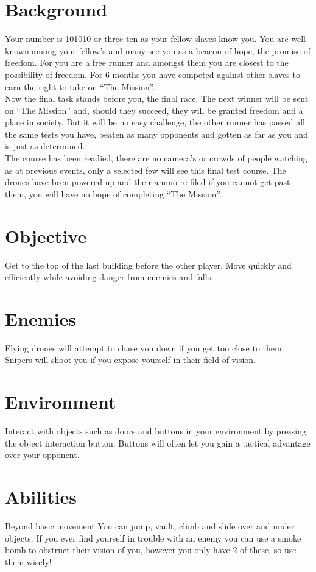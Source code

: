 \documentclass[11pt,a4paper]{article}
\begin{document}
\section*{Background}
Your number is 101010 or three-ten as your fellow slaves know you. You are well known among your fellow’s and many see you as a beacon of hope, the promise of freedom. For you are a free runner and amongst them you are closest to the possibility of freedom. For 6 months you have competed against other slaves to earn the right to take on ``The Mission''.\smallskip\\
Now the final task stands before you, the final race. The next winner will be sent on ``The Mission'' and, should they succeed, they will be granted freedom and a place in society. But it will be no easy challenge, the other runner has passed all the same tests you have, beaten as many opponents and gotten as far as you and is just as determined.\smallskip\\
The course has been readied, there are no camera’s or crowds of people watching as at previous events, only a selected few will see this final test course. The drones have been powered up and their ammo re-filed if you cannot get past them, you will have no hope of completing ``The Mission''.
\section*{Objective}
Get to the top of the last building before the other player. Move quickly and efficiently while avoiding danger from enemies and falls.
\section*{Enemies}
Flying drones will attempt to chase you down if you get too close to them. Snipers will shoot you if you expose yourself in their field of vision.
\section*{Environment}
Interact with objects such as doors and buttons in your environment by pressing the object interaction button. Buttons will often let you gain a tactical advantage over your opponent.
\section*{Abilities}
Beyond basic movement You can jump, vault, climb and slide over and under objects. If you ever find yourself in trouble with an enemy you can use a smoke bomb to obstruct their vision of you, however you only have 2 of these, so use them wisely! 
\end{document}
